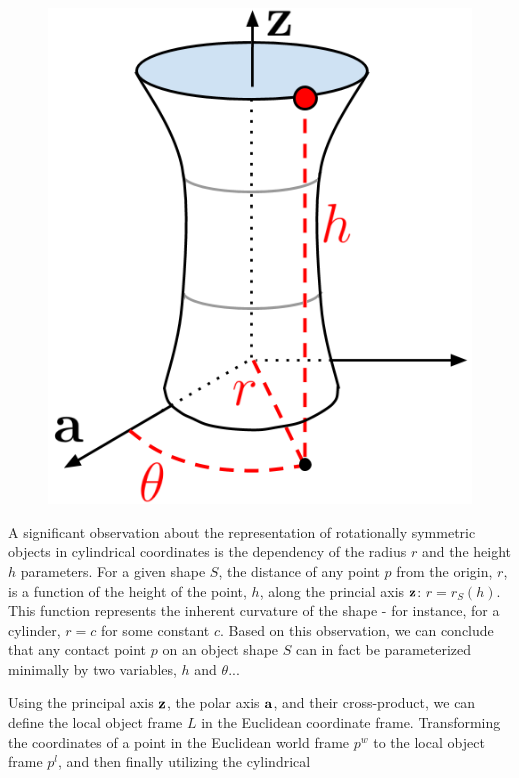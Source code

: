 \documentclass{aamas2015}
\begin{document}
\begin{figure}[ht!]
  \begin{center}
    \includegraphics[width=0.8\linewidth]{./images/representation.png} \quad 
  \end{center}
  \label{fig:representation}
\end{figure}

\newpage

A significant observation about the representation of rotationally symmetric objects in cylindrical
coordinates is the dependency of the radius $r$ and the height $h$ parameters. For a given shape $S$,
the distance of any point $p$ from the origin, $r$, is a function of the height of the point, $h$, 
along the princial axis $\textbf{z}$: $r = r_S(h)$. This function represents the inherent curvature of
the shape - for instance, for a cylinder, $r = c$ for some constant $c$. Based on this observation,
we can conclude that any contact point $p$ on an object shape $S$ can in fact be parameterized
minimally by two variables, $h$ and $\theta$...

Using the principal axis $\textbf{z}$, the polar axis $\textbf{a}$, and their cross-product, we can define
the local object frame $L$ in the Euclidean coordinate frame. Transforming the coordinates of
a point in the Euclidean world frame $p^w$ to the local object frame $p^l$, and then finally utilizing
the cylindrical 
\end{document}
